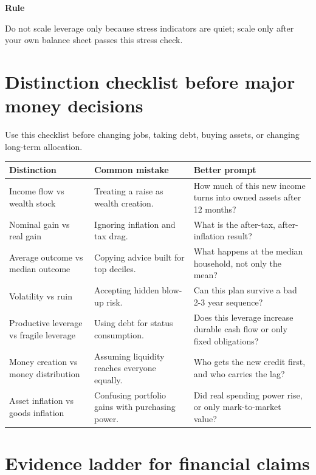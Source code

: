 \documentclass[11pt,openany]{book}
\begin{document}
\begin{signalbox}
\textbf{Rule}\par
Do not scale leverage only because stress indicators are quiet; scale only after your own balance sheet passes this stress check.
\end{signalbox}

\section{Distinction checklist before major money decisions}

Use this checklist before changing jobs, taking debt, buying assets, or changing long-term allocation.

\begin{center}
\small
\begin{tabularx}{\textwidth}{>{\raggedright\arraybackslash}p{}>{\raggedright\arraybackslash}p{}X}
\toprule
\textbf{Distinction} & \textbf{Common mistake} & \textbf{Better prompt} \\
\midrule
Income flow vs wealth stock & Treating a raise as wealth creation. & How much of this new income turns into owned assets after 12 months? \\
Nominal gain vs real gain & Ignoring inflation and tax drag. & What is the after-tax, after-inflation result? \\
Average outcome vs median outcome & Copying advice built for top deciles. & What happens at the median household, not only the mean? \\
Volatility vs ruin & Accepting hidden blow-up risk. & Can this plan survive a bad 2-3 year sequence? \\
Productive leverage vs fragile leverage & Using debt for status consumption. & Does this leverage increase durable cash flow or only fixed obligations? \\
Money creation vs money distribution & Assuming liquidity reaches everyone equally. & Who gets the new credit first, and who carries the lag? \\
Asset inflation vs goods inflation & Confusing portfolio gains with purchasing power. & Did real spending power rise, or only mark-to-market value? \\
\bottomrule
\end{tabularx}
\normalsize
\end{center}

\section{Evidence ladder for financial claims}
\end{document}
